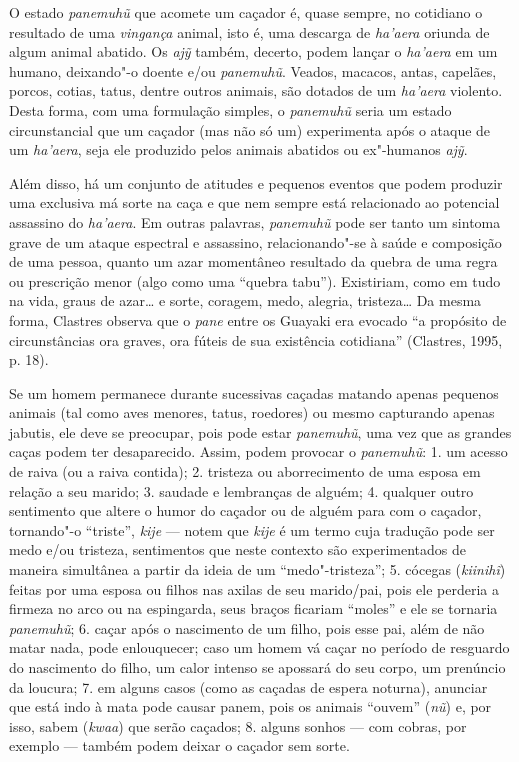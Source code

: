 O estado \emph{panemuhũ} que acomete um caçador é, quase sempre, no
cotidiano o resultado de uma \emph{vingança} animal, isto é, uma
descarga de \emph{ha'aera} oriunda de algum animal abatido. Os
\emph{ajỹ} também, decerto, podem lançar o \emph{ha'aera} em um humano,
deixando"-o doente e/ou \emph{panemuhũ}. Veados, macacos, antas,
capelães, porcos, cotias, tatus, dentre outros animais, são dotados de
um \emph{ha'aera} violento. Desta forma, com uma formulação simples, o
\emph{panemuhũ} seria um estado circunstancial que um caçador (mas não
só um) experimenta após o ataque de um \emph{ha'aera}, seja ele
produzido pelos animais abatidos ou ex"-humanos \emph{ajỹ}.

Além disso, há um conjunto de atitudes e pequenos eventos que podem
produzir uma exclusiva má sorte na caça e que nem sempre está
relacionado ao potencial assassino do \emph{ha'aera}. Em outras
palavras, \emph{panemuhũ} pode ser tanto um sintoma grave de um ataque
espectral e assassino, relacionando"-se à saúde e composição de uma
pessoa, quanto um azar momentâneo resultado da quebra de uma regra ou
prescrição menor (algo como uma ``quebra tabu''). Existiriam, como em tudo
na vida, graus de azar\ldots{} e sorte, coragem, medo, alegria, tristeza\ldots{}
Da mesma forma, Clastres observa que o \emph{pane} entre os Guayaki era
evocado ``a propósito de circunstâncias ora graves, ora fúteis de sua
existência cotidiana'' (Clastres, 1995, p. 18).

Se um homem permanece durante sucessivas caçadas matando apenas pequenos
animais (tal como aves menores, tatus, roedores) ou mesmo capturando
apenas jabutis, ele deve se preocupar, pois pode estar \emph{panemuhũ},
uma vez que as grandes caças podem ter desaparecido. Assim, podem
provocar o \emph{panemuhũ}: 1. um acesso de raiva (ou a raiva contida);
2. tristeza ou aborrecimento de uma esposa em relação a seu marido; 3.
saudade e lembranças de alguém; 4. qualquer outro sentimento que altere
o humor do caçador ou de alguém para com o caçador, tornando"-o
``triste'', \emph{kije} --- notem que \emph{kije} é um termo cuja tradução
pode ser medo e/ou tristeza, sentimentos que neste contexto são
experimentados de maneira simultânea a partir da ideia de um
``medo"-tristeza''; 5. cócegas (\emph{kiinihĩ}) feitas por uma esposa ou
filhos nas axilas de seu marido/pai, pois ele perderia a firmeza no arco
ou na espingarda, seus braços ficariam ``moles'' e ele se tornaria
\emph{panemuhũ}; 6. caçar após o nascimento de um filho, pois esse pai,
além de não matar nada, pode enlouquecer; caso um homem vá caçar no
período de resguardo do nascimento do filho, um calor intenso se
apossará do seu corpo, um prenúncio da loucura; 7. em alguns casos (como
as caçadas de espera noturna), anunciar que está indo à mata pode causar
panem, pois os animais ``ouvem'' (\emph{nũ}) e, por isso, sabem
(\emph{kwaa}) que serão caçados; 8. alguns sonhos --- com cobras, por
exemplo --- também podem deixar o caçador sem sorte.

